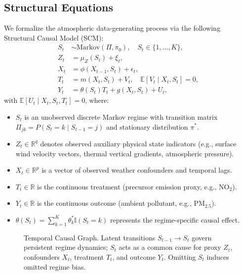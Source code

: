 \documentclass[twoside]{article}
\theoremstyle{definition}
\newcommand{\E}{\mathbb{E}}
\newcommand{\R}{\mathbb{R}}
\newcommand{\one}{\mathbb{I}}
\begin{document}
\subsection{Structural Equations}
We formalize the atmospheric data-generating process via the following Structural Causal Model (SCM):
\begin{align}
    S_t &\sim \text{Markov}(\Pi, \pi_0), \quad S_t \in \{1, \dots, K\}, \label{eq:regime_scm} \\
    Z_t &= \mu_Z(S_t) + \xi_t, \label{eq:state_obs} \\
    X_t &= \phi(X_{t-1}, S_t) + \epsilon_t, \label{eq:confounders} \\
    T_t &= m(X_t, S_t) + V_t, \quad \E[V_t \mid X_t, S_t] = 0, \label{eq:treatment} \\
    Y_t &= \theta(S_t) T_t + g(X_t, S_t) + U_t, \label{eq:outcome}
\end{align}
with $\E[U_t \mid X_t, S_t, T_t] = 0$, where:
\begin{itemize}\setlength{\itemsep}{-2pt}\setlength{\parskip}{0pt}
    \item $S_t$ is an unobserved discrete Markov regime with transition matrix $\Pi_{jk} = P(S_t = k \mid S_{t-1} = j)$ and stationary distribution $\pi^*$.
    \item $Z_t \in \R^q$ denotes observed auxiliary physical state indicators (e.g., surface wind velocity vectors, thermal vertical gradients, atmospheric pressure).
    \item $X_t \in \R^p$ is a vector of observed weather confounders and temporal lags.
    \item $T_t \in \R$ is the continuous treatment (precursor emission proxy, e.g., $\text{NO}_2$).
    \item $Y_t \in \R$ is the continuous outcome (ambient pollutant, e.g., $\text{PM}_{2.5}$).
    \item $\theta(S_t) = \sum_{k=1}^K \theta_k^* \one(S_t = k)$ represents the regime-specific causal effect.
\end{itemize}

\begin{figure}[t]
\centering
{}
\caption{Temporal Causal Graph. Latent transitions $S_{t-1} \to S_t$ govern persistent regime dynamics; $S_t$ acts as a common cause for proxy $Z_t$, confounders $X_t$, treatment $T_t$, and outcome $Y_t$. Omitting $S_t$ induces omitted regime bias.}
\label{fig:dag}
\end{figure}
\end{document}

